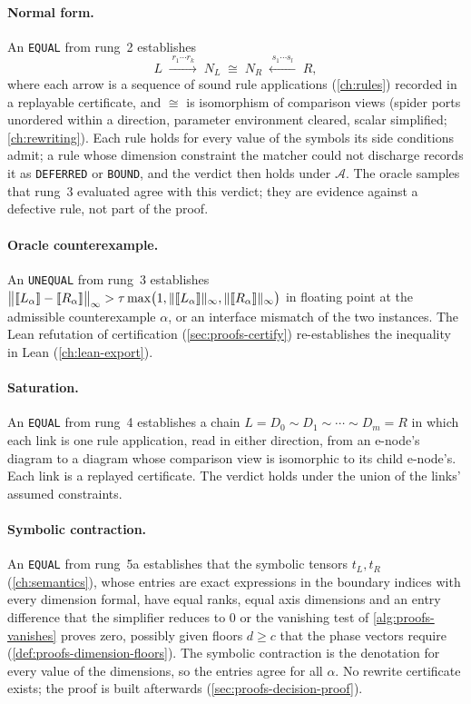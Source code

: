 \paragraph{Normal form.} An \texttt{EQUAL} from rung~2 establishes
\[
L \;\xrightarrow{\;r_1\cdots r_k\;}\; N_L \;\cong\; N_R \;\xleftarrow{\;s_1\cdots s_l\;}\; R,
\]
where each arrow is a sequence of sound rule applications (\cref{ch:rules}) recorded in a replayable certificate, and $\cong$ is isomorphism of comparison views (spider ports unordered within a direction, parameter environment cleared, scalar simplified; \cref{ch:rewriting}). Each rule holds for every value of the symbols its side conditions admit; a rule whose dimension constraint the matcher could not discharge records it as \texttt{DEFERRED} or \texttt{BOUND}, and the verdict then holds under $\mathcal{A}$. The oracle samples that rung~3 evaluated agree with this verdict; they are evidence against a defective rule, not part of the proof.

\paragraph{Oracle counterexample.} An \texttt{UNEQUAL} from rung~3 establishes $\bigl\|\llbracket L_\alpha \rrbracket-\llbracket R_\alpha \rrbracket\bigr\|_\infty>\tau\max\bigl(1,\|\llbracket L_\alpha \rrbracket\|_\infty,\|\llbracket R_\alpha \rrbracket\|_\infty\bigr)$ in floating point at the admissible counterexample $\alpha$, or an interface mismatch of the two instances. The Lean refutation of certification (\cref{sec:proofs-certify}) re-establishes the inequality in Lean (\cref{ch:lean-export}).

\paragraph{Saturation.} An \texttt{EQUAL} from rung~4 establishes a chain $L=D_0\sim D_1\sim\cdots\sim D_m=R$ in which each link is one rule application, read in either direction, from an e-node's diagram to a diagram whose comparison view is isomorphic to its child e-node's. Each link is a replayed certificate. The verdict holds under the union of the links' assumed constraints.

\paragraph{Symbolic contraction.} An \texttt{EQUAL} from rung~5a establishes that the symbolic tensors $t_L,t_R$ (\cref{ch:semantics}), whose entries are exact expressions in the boundary indices with every dimension formal, have equal ranks, equal axis dimensions and an entry difference that the simplifier reduces to $0$ or the vanishing test of \cref{alg:proofs-vanishes} proves zero, possibly given floors $d\ge c$ that the phase vectors require (\cref{def:proofs-dimension-floors}). The symbolic contraction is the denotation for every value of the dimensions, so the entries agree for all $\alpha$. No rewrite certificate exists; the proof is built afterwards (\cref{sec:proofs-decision-proof}).

